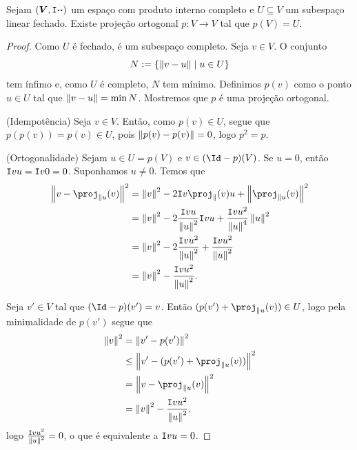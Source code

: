 \begin{prop}
Sejam $(\bm V, \mathtt I{\bm{\cdot}}{\bm{\cdot}})$ um espaço com produto interno completo e $U \subseteq V$ um subespaço linear fechado. Existe projeção ortogonal $p\colon V \to V$ tal que $p(V)=U$.
\end{prop}
\begin{proof}
Como $U$ é fechado, é um subespaço completo. Seja $v \in V$. O conjunto
	\begin{equation*}
	N := \left\{\left\Vert{v-u}\right\Vert \;\middle\vert\; u \in U \right\}
	\end{equation*}
tem ínfimo e, como $U$ é completo, $N$ tem mínimo. Definimos $p(v)$ como o ponto $u \in U$ tal que $\left\Vert{v-u}\right\Vert = \min N$. %
Mostremos que $p$ é uma projeção ortogonal.

(Idempotência) Seja $v \in V$. Então, como $p(v) \in U$, segue que $p(p(v)) = p(v) \in U$, pois $\left\Vert{p(v) - p(v)}\right\Vert=0$, logo $p^2=p$.

(Ortogonalidade) Sejam $u \in U=p(V)$ e $v \in (\Id-p)(V)$. Se $u=0$, então $\mathtt I{v}{u} = \mathtt I{v}{0}=0$. Suponhamos $u \neq 0$. Temos que
	\begin{align*}
	\nor{v - \proj_{\parallel u}(v)}^2 &= \nor{v}^2 - 2\inte{v}{\proj_{\parallel}(v) u} + \nor{\proj_{\parallel u}(v)}^2 \\
		&= \nor{v}^2 - 2\frac{\inte{v}{u}}{\nor{u}^2}\inte{v}{u} + \frac{\inte{v}{u}^2}{\nor{u}^4}\nor{u}^2 \\
		&=  \nor{v}^2 - 2\frac{\inte{v}{u}^2}{\nor{u}^2} + \frac{\inte{v}{u}^2}{\nor{u}^2} \\
		&= \nor{v}^2 - \frac{\inte{v}{u}^2}{\nor{u}^2}.
	\end{align*}

Seja $v' \in V$ tal que $(\Id-p)(v')=v$. Então $(p(v') + \proj_{\parallel u}(v)) \in U$, logo pela minimalidade de $p(v')$ segue que
	\begin{align*}
	\nor{v}^2 &= \nor{v'-p(v')}^2 \\
		&\leq \nor{v'-(p(v') + \proj_{\parallel u}(v))}^2 \\
		&= \nor{v - \proj_{\parallel u}(v)}^2 \\
		&= \nor{v}^2 - \frac{\inte{v}{u}^2}{\nor{u}^2},
	\end{align*}
logo $\frac{\mathtt I{v}{u}^2}{\left\Vert{u}\right\Vert^2} = 0$, o que é equivalente a $\mathtt I{v}{u}=0$.


\end{proof}
